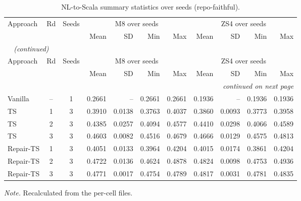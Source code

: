 {\small
{}
\setlength{\tabcolsep}{4.2pt}
\begin{longtable}{@{}lccrrrrrrrr@{}}
\caption{NL-to-Scala summary statistics over seeds (repo-faithful).}\label{tab:gen-scala-stats}\\
\toprule
\rowcolor{headshade}Approach & Rd & Seeds & \multicolumn{4}{c}{M8 over seeds} & \multicolumn{4}{c}{ZS4 over seeds}\\\rowcolor{headshade} & & & Mean & SD & Min & Max & Mean & SD & Min & Max\\
\midrule
\endfirsthead
\multicolumn{11}{l}{\textit{\tablename~\thetable{} (continued)}}\\
\toprule
\rowcolor{headshade}Approach & Rd & Seeds & \multicolumn{4}{c}{M8 over seeds} & \multicolumn{4}{c}{ZS4 over seeds}\\\rowcolor{headshade} & & & Mean & SD & Min & Max & Mean & SD & Min & Max\\
\midrule
\endhead
\midrule
\multicolumn{11}{r}{\textit{continued on next page}}\\
\endfoot
\bottomrule
\endlastfoot
Vanilla & -- & 1 & 0.2661 & -- & 0.2661 & 0.2661 & 0.1936 & -- & 0.1936 & 0.1936\\
TS & 1 & 3 & 0.3910 & 0.0138 & 0.3763 & 0.4037 & 0.3860 & 0.0093 & 0.3773 & 0.3958\\
TS & 2 & 3 & 0.4385 & 0.0257 & 0.4094 & 0.4577 & 0.4410 & 0.0298 & 0.4066 & 0.4589\\
TS & 3 & 3 & 0.4603 & 0.0082 & 0.4516 & 0.4679 & 0.4666 & 0.0129 & 0.4575 & 0.4813\\
Repair-TS & 1 & 3 & 0.4051 & 0.0133 & 0.3964 & 0.4204 & 0.4015 & 0.0174 & 0.3861 & 0.4204\\
Repair-TS & 2 & 3 & 0.4722 & 0.0136 & 0.4624 & 0.4878 & 0.4824 & 0.0098 & 0.4753 & 0.4936\\
Repair-TS & 3 & 3 & 0.4771 & 0.0017 & 0.4754 & 0.4789 & 0.4817 & 0.0031 & 0.4781 & 0.4835\\
\end{longtable}
}
\vspace{-0.6\baselineskip}
{\footnotesize\color{slate}\textit{Note.} Recalculated from the per-cell files.\par}
\medskip
